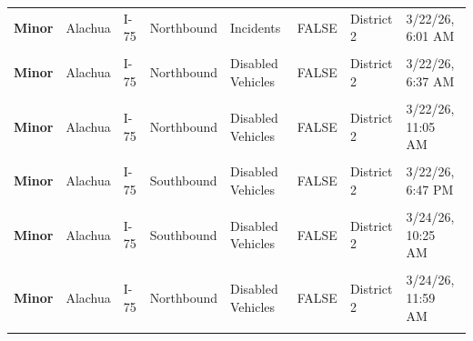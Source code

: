 \documentclass[
]{article}
\begin{document}
\begin{longtable}[t]{>{\raggedright\arraybackslash}p{1.5cm}>{\raggedright\arraybackslash}p{2.5cm}>{\raggedright\arraybackslash}p{3cm}>{\raggedright\arraybackslash}p{1.8cm}>{\raggedright\arraybackslash}p{2.5cm}lll}
\textbf{Minor} & Alachua & I-75 & Northbound & Incidents & FALSE & District 2 & 3/22/26, 6:01 AM\\
\textbf{\cellcolor{gray!10}{Minor}} & \cellcolor{gray!10}{Alachua} & \cellcolor{gray!10}{I-75} & \cellcolor{gray!10}{Southbound} & \cellcolor{gray!10}{Disabled Vehicles} & \cellcolor{gray!10}{FALSE} & \cellcolor{gray!10}{District 2} & \cellcolor{gray!10}{3/22/26, 6:01 AM}\\
\addlinespace
\textbf{Minor} & Alachua & I-75 & Northbound & Disabled Vehicles & FALSE & District 2 & 3/22/26, 6:37 AM\\
\textbf{\cellcolor{gray!10}{Minor}} & \cellcolor{gray!10}{Alachua} & \cellcolor{gray!10}{I-75} & \cellcolor{gray!10}{Southbound} & \cellcolor{gray!10}{Disabled Vehicles} & \cellcolor{gray!10}{FALSE} & \cellcolor{gray!10}{District 2} & \cellcolor{gray!10}{3/22/26, 8:30 AM}\\
\textbf{Minor} & Alachua & I-75 & Northbound & Disabled Vehicles & FALSE & District 2 & 3/22/26, 11:05 AM\\
\textbf{\cellcolor{gray!10}{Minor}} & \cellcolor{gray!10}{Alachua} & \cellcolor{gray!10}{I-75} & \cellcolor{gray!10}{Southbound} & \cellcolor{gray!10}{Disabled Vehicles} & \cellcolor{gray!10}{FALSE} & \cellcolor{gray!10}{District 2} & \cellcolor{gray!10}{3/22/26, 6:22 PM}\\
\textbf{Minor} & Alachua & I-75 & Southbound & Disabled Vehicles & FALSE & District 2 & 3/22/26, 6:47 PM\\
\addlinespace
\textbf{\cellcolor{gray!10}{Minor}} & \cellcolor{gray!10}{Alachua} & \cellcolor{gray!10}{I-75} & \cellcolor{gray!10}{Northbound} & \cellcolor{gray!10}{Disabled Vehicles} & \cellcolor{gray!10}{FALSE} & \cellcolor{gray!10}{District 2} & \cellcolor{gray!10}{3/22/26, 7:57 PM}\\
\textbf{Minor} & Alachua & I-75 & Southbound & Disabled Vehicles & FALSE & District 2 & 3/24/26, 10:25 AM\\
\textbf{\cellcolor{gray!10}{Minor}} & \cellcolor{gray!10}{Alachua} & \cellcolor{gray!10}{I-75} & \cellcolor{gray!10}{Northbound} & \cellcolor{gray!10}{Disabled Vehicles} & \cellcolor{gray!10}{FALSE} & \cellcolor{gray!10}{District 2} & \cellcolor{gray!10}{3/24/26, 11:29 AM}\\
\textbf{Minor} & Alachua & I-75 & Northbound & Disabled Vehicles & FALSE & District 2 & 3/24/26, 11:59 AM\\
\textbf{\cellcolor{gray!10}{Minor}} & \cellcolor{gray!10}{Alachua} & \cellcolor{gray!10}{I-75} & \cellcolor{gray!10}{Northbound} & \cellcolor{gray!10}{Incidents} & \cellcolor{gray!10}{FALSE} & \cellcolor{gray!10}{District 2} & \cellcolor{gray!10}{3/24/26, 7:50 PM}\\

\end{longtable}
\end{document}
